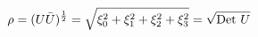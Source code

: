 \begin{equation}
\rho = (U \bar{U})^{\frac{1}{2}} =
{\sqrt{\xi_{0}^{2}+\xi_{1}^{2}+\xi_{2}^{2}+\xi_{3}^{2}}}= {\sqrt{{\rm Det}~U}}                  
\label{6.3}
\end{equation}


